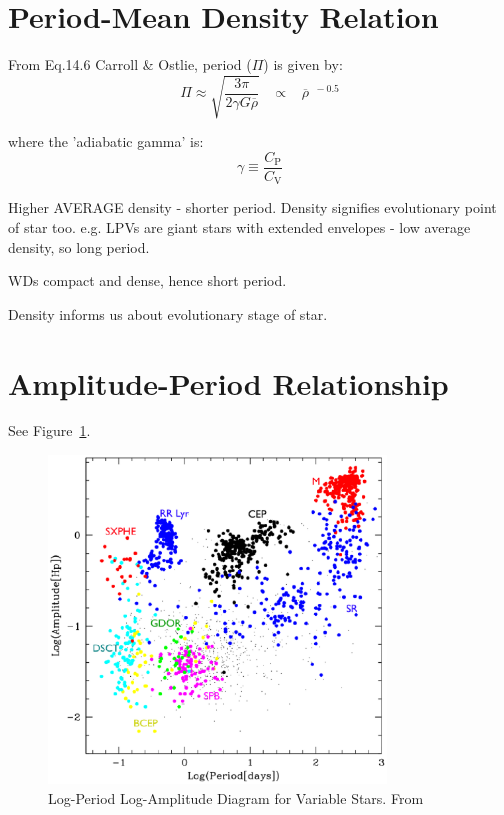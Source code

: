 \documentclass{spy}
\begin{document}
\section{Period-Mean Density Relation}
From Eq.14.6 Carroll \& Ostlie, period (\(\Pi\)) is given by:
\begin{equation}
    \Pi \approx \sqrt{\frac{3 \pi}{2 \gamma G \overline{\rho}}}
    \;\;\; \propto \;\;\; \overline{\rho}^{\;\;-0.5}
\end{equation}

where the 'adiabatic gamma' is:
\begin{equation}
    \gamma \equiv \frac{C_\mathrm{P}}{C_\mathrm{V}}
\end{equation}

Higher AVERAGE density - shorter period. Density signifies evolutionary point of star too. 
e.g. LPVs are giant stars with extended envelopes - low average density, so long period.

WDs compact and dense, hence short period. 

Density informs us about evolutionary stage of star. 



\section{Amplitude-Period Relationship}
See Figure~\ref{period_amp_diagram}.

\begin{figure}[ht]
    \centering
    \includegraphics[width=0.8\textwidth]{period_amplitude.eps}
    \caption{Log-Period Log-Amplitude Diagram for Variable Stars. From \citet{eyerVariableStarsObservational2008}}
    \label{period_amp_diagram}
\end{figure}
\end{document}
